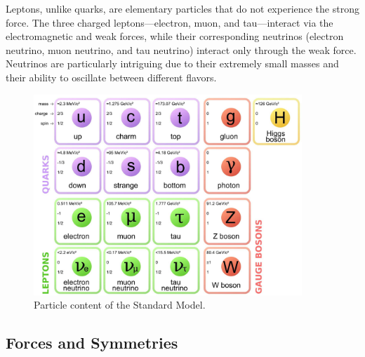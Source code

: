 Leptons, unlike quarks, are elementary particles that do not experience the strong force. The three charged leptons—electron, muon, and tau—interact via the electromagnetic and weak forces, while their corresponding neutrinos (electron neutrino, muon neutrino, and tau neutrino) interact only through the weak force. Neutrinos are particularly intriguing due to their extremely small masses and their ability to oscillate between different flavors.

% 

\begin{figure}
\centering
\includegraphics[width=0.9\textwidth,clip] {figures/2000px-Standard_Model_of_Elementary_Particles.png}
\caption{Particle content of the Standard Model.}
\label{fig:standardmodel}
\end{figure}

\subsection{Forces and Symmetries}


